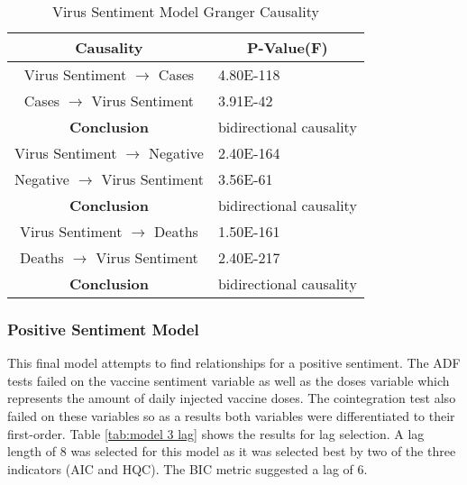 \begin{table}[H]
\centering
\begin{tabular}{@{}cl@{}}
\toprule
\textbf{Causality} & \multicolumn{1}{c}{\textbf{P-Value(F)}} \\ \midrule
Virus Sentiment $\rightarrow$ Cases & 4.80E-118 \\
Cases $\rightarrow$ Virus Sentiment & 3.91E-42 \\
\textbf{Conclusion} & \multicolumn{1}{r}{bidirectional causality} \\
Virus Sentiment $\rightarrow$ Negative & 2.40E-164 \\
Negative $\rightarrow$ Virus Sentiment & 3.56E-61 \\
\textbf{Conclusion} & \multicolumn{1}{r}{bidirectional causality} \\
Virus Sentiment $\rightarrow$ Deaths & 1.50E-161 \\
Deaths $\rightarrow$ Virus Sentiment & 2.40E-217 \\
\textbf{Conclusion} & \multicolumn{1}{r}{bidirectional causality} \\
\bottomrule
\end{tabular}
\caption{Virus Sentiment Model Granger Causality}
\label{tab:model 2 causality}
\end{table}

\subsubsection{Positive Sentiment Model}

This final model attempts to find relationships for a positive sentiment. The ADF tests failed on the vaccine sentiment variable as well as the doses variable which represents the amount of daily injected vaccine doses. The cointegration test also failed on these variables so as a results both variables were differentiated to their first-order. Table \ref{tab:model 3 lag} shows the results for lag selection. A lag length of 8 was selected for this model as it was selected best by two of the three indicators (AIC and HQC). The BIC metric suggested a lag of 6.

